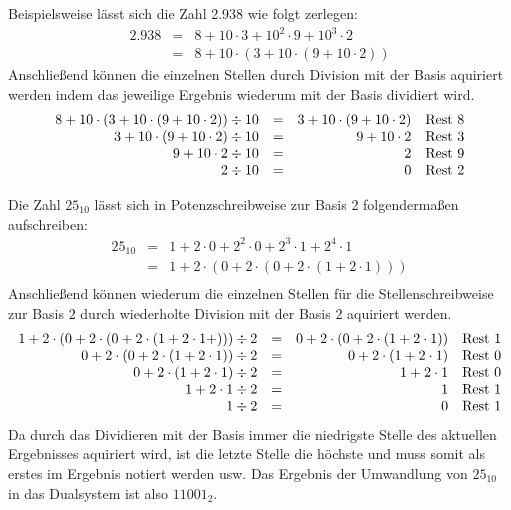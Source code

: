 Beispielsweise lässt sich die Zahl 2.938 wie folgt zerlegen:
\begin{eqnarray*}
	2.938 & = & 8 + 10 \cdot 3 + 10^2 \cdot 9 + 10^3 \cdot 2 \\
	& = & 8 + 10 \cdot (3 + 10 \cdot(9 + 10 \cdot 2))
\end{eqnarray*}
Anschließend können die einzelnen Stellen durch Division mit der Basis aquiriert werden indem das jeweilige Ergebnis wiederum mit der Basis dividiert wird.
$$
\begin{array}{rrrl}
  8 + 10 \cdot (3 + 10 \cdot(9 + 10 \cdot 2)) \div 10 & = & 3 + 10 \cdot(9 + 10 \cdot 2)  & \textnormal{Rest } 8 \\
  3 + 10 \cdot(9 + 10 \cdot 2) \div 10 & = & 9 + 10 \cdot 2  & \textnormal{Rest } 3 \\
  9 + 10 \cdot 2 \div 10 & = & 2  & \textnormal{Rest } 9 \\
  2 \div 10 & = & 0  & \textnormal{Rest } 2 \\
\end{array}
$$

Die Zahl $25_{10}$ lässt sich in Potenzschreibweise zur Basis 2 folgendermaßen aufschreiben:
\begin{eqnarray*}
	25_{10} & = & 1 + 2 \cdot 0 + 2^2 \cdot 0 
		+ 2^3 \cdot 1 + 2^4 \cdot 1 \\
	& = & 1 + 2 \cdot (0 + 2 \cdot (0 
		+ 2 \cdot (1 + 2 \cdot 1))) \\
\end{eqnarray*}
Anschließend können wiederum die einzelnen Stellen für die Stellenschreibweise zur Basis $2$ durch wiederholte Division mit der Basis $2$ aquiriert werden.
$$
\begin{array}{rrrl}
	1 + 2 \cdot (0 + 2 \cdot (0 + 2 \cdot (1 + 2 \cdot 1 + ))) \div 2 
		& = & 0 + 2 \cdot (0 + 2 \cdot (1 + 2 \cdot 1)) 
		& \textnormal{Rest } 1\\
		0 + 2 \cdot (0 + 2 \cdot (1 + 2 \cdot 1)) \div 2
		& = & 0 + 2 \cdot (1 + 2 \cdot 1) 
		& \textnormal{Rest } 0\\
		0 + 2 \cdot (1 + 2 \cdot 1) \div 2
		& = & 1 + 2 \cdot 1 
		& \textnormal{Rest } 0\\
		1 + 2 \cdot 1 \div 2
		& = & 1 
		& \textnormal{Rest } 1\\
		1 \div 2
		& = & 0 
		& \textnormal{Rest } 1\\
\end{array}
$$
Da durch das Dividieren mit der Basis immer die niedrigste Stelle des aktuellen Ergebnisses aquiriert wird, ist die letzte Stelle die höchste und muss somit als erstes im Ergebnis notiert werden usw. Das Ergebnis der Umwandlung von $25_{10}$ in das Dualsystem ist also $11001_2$.

